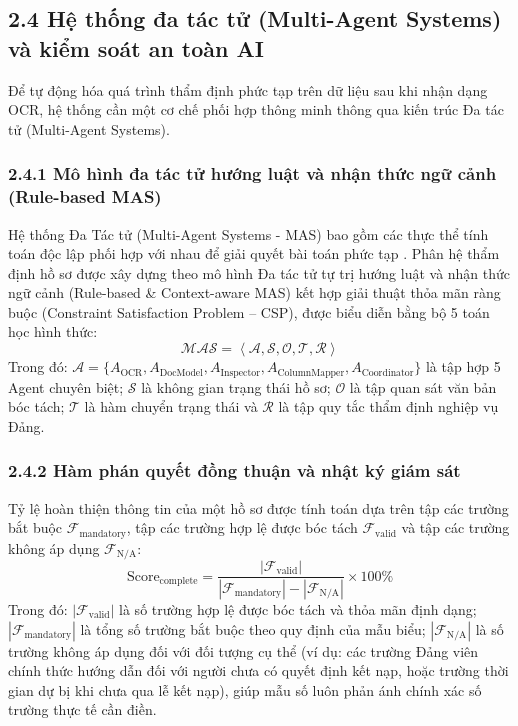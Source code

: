 \documentclass[12pt,a4paper]{report}
\begin{document}
\subsection*{2.4 Hệ thống đa tác tử (Multi-Agent Systems) và kiểm soát an toàn AI}
Để tự động hóa quá trình thẩm định phức tạp trên dữ liệu sau khi nhận dạng OCR, hệ thống cần một cơ chế phối hợp thông minh thông qua kiến trúc Đa tác tử (Multi-Agent Systems).

\subsubsection*{2.4.1 Mô hình đa tác tử hướng luật và nhận thức ngữ cảnh (Rule-based MAS)}
Hệ thống Đa Tác tử (Multi-Agent Systems - MAS) bao gồm các thực thể tính toán độc lập phối hợp với nhau để giải quyết bài toán phức tạp \cite{wang2024survey}. Phân hệ thẩm định hồ sơ được xây dựng theo mô hình Đa tác tử tự trị hướng luật và nhận thức ngữ cảnh (Rule-based \& Context-aware MAS) kết hợp giải thuật thỏa mãn ràng buộc (Constraint Satisfaction Problem -- CSP), được biểu diễn bằng bộ 5 toán học hình thức:
\begin{equation}
  \mathcal{MAS} = \left\langle \mathcal{A}, \mathcal{S}, \mathcal{O}, \mathcal{T}, \mathcal{R} \right\rangle
\end{equation}
Trong đó: $\mathcal{A} = \{A_{\text{OCR}}, A_{\text{DocModel}}, A_{\text{Inspector}}, A_{\text{ColumnMapper}}, A_{\text{Coordinator}}\}$ là tập hợp 5 Agent chuyên biệt; $\mathcal{S}$ là không gian trạng thái hồ sơ; $\mathcal{O}$ là tập quan sát văn bản bóc tách; $\mathcal{T}$ là hàm chuyển trạng thái và $\mathcal{R}$ là tập quy tắc thẩm định nghiệp vụ Đảng.

\subsubsection*{2.4.2 Hàm phán quyết đồng thuận và nhật ký giám sát}
Tỷ lệ hoàn thiện thông tin của một hồ sơ được tính toán dựa trên tập các trường bắt buộc $\mathcal{F}_{\text{mandatory}}$, tập các trường hợp lệ được bóc tách $\mathcal{F}_{\text{valid}}$ và tập các trường không áp dụng $\mathcal{F}_{\text{N/A}}$:
\begin{equation}
  \text{Score}_{\text{complete}} = \frac{|\mathcal{F}_{\text{valid}}|}{|\mathcal{F}_{\text{mandatory}}| - |\mathcal{F}_{\text{N/A}}|} \times 100\%
\end{equation}
Trong đó: $|\mathcal{F}_{\text{valid}}|$ là số trường hợp lệ được bóc tách và thỏa mãn định dạng; $|\mathcal{F}_{\text{mandatory}}|$ là tổng số trường bắt buộc theo quy định của mẫu biểu; $|\mathcal{F}_{\text{N/A}}|$ là số trường không áp dụng đối với đối tượng cụ thể (ví dụ: các trường Đảng viên chính thức hướng dẫn đối với người chưa có quyết định kết nạp, hoặc trường thời gian dự bị khi chưa qua lễ kết nạp), giúp mẫu số luôn phản ánh chính xác số trường thực tế cần điền.
\end{document}
